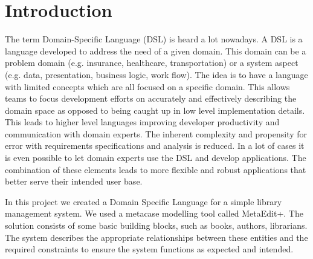 \section{Introduction}
The term Domain-Specific Language (DSL) is heard a lot nowadays. A DSL is a language developed to address the need of a given domain. This domain can be a problem domain (e.g. insurance, healthcare, transportation) or a system aspect (e.g. data, presentation, business logic, work flow).
The idea is to have a language with limited concepts which are all focused on a specific domain. This allows teams to focus development efforts on accurately and effectively describing the domain space as opposed to being caught up in low level implementation details.
This leads to higher level languages improving developer productivity and communication with domain experts. The inherent complexity and propensity for error with requirements specifications and analysis is reduced.
In a lot of cases it is even possible to let domain experts use the DSL and develop applications. The combination of these elements leads to more flexible and robust applications that better serve their intended user base.

In this project we created a Domain Specific Language for a simple library management system. We used a metacase modelling tool called MetaEdit+.  The solution consists of some basic building blocks, such as books, authors, librarians. The system describes the appropriate relationships between these entities and the required constraints to ensure the system functions as expected and intended.